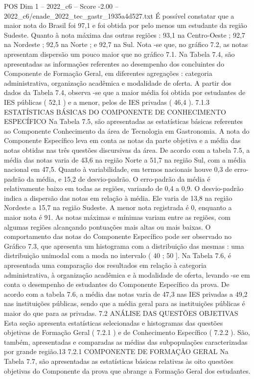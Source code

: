 \begin{textsample}{POS Dim 1 – 2022\_c6 – Score -2.00 – 2022\_c6/enade\_2022\_tec\_gastr\_1935a4d527.txt}
É possível constatar que a maior nota do Brasil foi 97,1 e foi obtida por pelo menos um estudante da região Sudeste.
Quanto à nota máxima das outras regiões : 93,1 na Centro-Oeste ; 92,7 na Nordeste ; 92,5 na Norte ; e 92,7 na Sul.
Nota -se que, no gráfico 7.2, as notas apresentam dispersão um pouco maior que no gráfico 7.1.
Na Tabela 7.4, são apresentadas as informações referentes ao desempenho dos concluintes do Componente de Formação Geral, em diferentes agregações : categoria administrativa, organização acadêmica e modalidade de oferta.
A partir dos dados da Tabela 7.4, observa -se que a maior média foi obtida por estudantes de IES públicas ( 52,1 ) e a menor, pelos de IES privadas ( 46,4 ). 7.1.3 ESTATÍSTICAS BÁSICAS DO COMPONENTE DE CONHECIMENTO ESPECÍFICO Na Tabela 7.5, são apresentadas as estatísticas básicas referentes ao Componente Conhecimento da área de Tecnologia em Gastronomia.
A nota do Componente Específico leva em conta as notas da parte objetiva e a média das notas obtidas nas três questões discursivas da área.
De acordo com a tabela 7.5, a média das notas varia de 43,6 na região Norte a 51,7 na região Sul, com a média nacional em 47,5.
Quanto à variabilidade, em termos nacionais houve 0,3 de erro-padrão da média, e 15,2 de desvio-padrão.
O erro-padrão da média é relativamente baixo em todas as regiões, variando de 0,4 a 0,9.
O desvio-padrão indica a dispersão das notas em relação à média.
Ele varia de 13,8 na região Nordeste a 15,7 na região Sudeste.
A menor nota registrada é 0, enquanto a maior nota é 91.
As notas máximas e mínimas variam entre as regiões, com algumas regiões alcançando pontuações mais altas ou mais baixas.
O comportamento das notas do Componente Específico pode ser observado no Gráfico 7.3, que apresenta um histograma com a distribuição das mesmas : uma distribuição unimodal com a moda no intervalo ( 40 ; 50 ].
Na Tabela 7.6, é apresentada uma comparação dos resultados em relação à categoria administrativa, à organização acadêmica e à modalidade de oferta, levando -se em conta o desempenho de estudantes do Componente Específico da prova.
De acordo com a tabela 7.6, a média das notas varia de 47,3 nas IES privadas a 49,2 nas instituições públicas, sendo que a média geral para as instituições públicas é maior do que para as privadas. 7.2 ANÁLISE DAS QUESTÕES OBJETIVAS Esta seção apresenta estatísticas selecionadas e histogramas das questões objetivas de Formação Geral ( 7.2.1 ) e de Conhecimento Específico ( 7.2.2 ).
São, também, apresentadas e comparadas as médias das subpopulações caracterizadas por grande região.13 7.2.1 COMPONENTE DE FORMAÇÃO GERAL Na Tabela 7.7, são apresentadas as estatísticas básicas relativas às oito questões objetivas do Componente da prova que abrange a Formação Geral dos estudantes.

\end{textsample}
